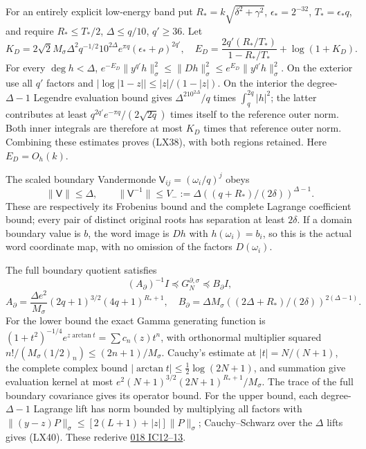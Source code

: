 \documentclass[10pt]{article}
\begin{document}
For an entirely explicit low-energy band put \(R_*=k\sqrt{\delta^2+\gamma^2}\), \(\epsilon_*=2^{-32}\), \(T_*=\epsilon_*q\), and require \(R_*\le T_*/2\), \(\Delta\le q/10\), \(q'\ge36\). Let \[
K_D=2\sqrt2M_\sigma\Delta^2q^{-1/2}10^{2\Delta}e^{\pi q}
(\epsilon_*+\rho)^{2q'},
\quad E_D=\frac{2q'(R_*/T_*)}{1-R_*/T_*}+\log(1+K_D).
\tag{LX38}
\] For every \(\deg h<\Delta\), \(e^{-E_D}\|y^{q'}h\|_\sigma^2\le\|Dh\|_\sigma^2\le e^{E_D}\|y^{q'}h\|_\sigma^2\). On the exterior use all \(q'\) factors and \(|\log|1-z||\le |z|/(1-|z|)\). On the interior the degree-\(\Delta-1\) Legendre evaluation bound gives \(\Delta^210^{2\Delta}/q\) times \(\int_q^{2q}|h|^2\); the latter contributes at least \(q^{2q'}e^{-\pi q}/(2\sqrt{2q})\) times itself to the reference outer norm. Both inner integrals are therefore at most \(K_D\) times that reference outer norm. Combining these estimates proves (LX38), with both regions retained. Here \(E_D=O_h(k)\).

The scaled boundary Vandermonde \(\mathsf V_{ij}=(\omega_i/q)^j\) obeys \[
\|\mathsf V\|\le\Delta,\qquad
\|\mathsf V^{-1}\|\le V_-:=\Delta((q+R_*)/(2\delta))^{\Delta-1}.
\tag{LX39}
\] These are respectively its Frobenius bound and the complete Lagrange coefficient bound; every pair of distinct original roots has separation at least \(2\delta\). If a domain boundary value is \(b\), the word image is \(Dh\) with \(h(\omega_i)=b_i\), so this is the actual word coordinate map, with no omission of the factors \(D(\omega_i)\).

The full boundary quotient satisfies \[
(A_\partial)^{-1}I\preceq G_N^{\partial,\sigma}\preceq B_\partial I,
\] \[
A_\partial=\frac{\Delta e^2}{M_\sigma}(2q+1)^{3/2}(4q+1)^{R_*+1},
\quad B_\partial=\Delta M_\sigma((2\Delta+R_*)/(2\delta))^{2(\Delta-1)}.
\tag{LX40}
\] For the lower bound the exact Gamma generating function is \((1+t^2)^{-1/4}e^{z\arctan t}=\sum c_n(z)t^n\), with orthonormal multiplier squared \(n!/(M_\sigma(1/2)_n)\le(2n+1)/M_\sigma\). Cauchy's estimate at \(|t|=N/(N+1)\), the complete complex bound \(|\arctan t|\le\tfrac12\log(2N+1)\), and summation give evaluation kernel at most \(e^2(N+1)^{3/2}(2N+1)^{R_*+1}/M_\sigma\). The trace of the full boundary covariance gives its operator bound. For the upper bound, each degree-\(\Delta-1\) Lagrange lift has norm bounded by multiplying all factors with \(\|(y-z)P\|_\sigma\le[2(L+1)+|z|]\|P\|_\sigma\); Cauchy--Schwarz over the \(\Delta\) lifts gives (LX40). These rederive \href{https://github.com/KokunoYumeto/zeta-function-research-reader/blob/75256b0237884bdef0074c2ac6310de1ea32ec26/workbenches/splitzero-tandem/continuations/20260921-invariant-collision/COLLISION_PROOFS.md\#L125}{018 IC12--13}.
\end{document}
